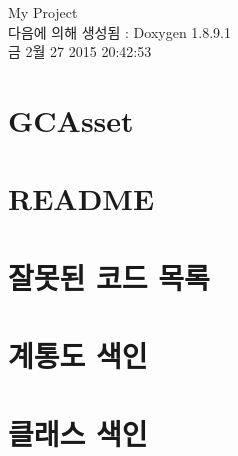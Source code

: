 \documentclass[twoside]{book}
\newcommand{\+}{\discretionary{\mbox{\scriptsize$\hookleftarrow$}}{}{}}
\newcommand{\clearemptydoublepage}{%
  \newpage{\pagestyle{empty}\cleardoublepage}%
}
\begin{document}
\hypersetup{pageanchor=false,
             bookmarks=true,
             bookmarksnumbered=true,
             pdfencoding=unicode
            }
\begin{titlepage}
\vspace*{7cm}
\begin{center}%
{\Large My Project }\\
\vspace*{1cm}
{\large 다음에 의해 생성됨 \+:  Doxygen 1.8.9.1}\\
\vspace*{0.5cm}
{\small 금 2월 27 2015 20:42:53}\\
\end{center}
\end{titlepage}
\clearemptydoublepage
\tableofcontents
\clearemptydoublepage
{}
\hypersetup{pageanchor=true}

\chapter{G\+C\+Asset}
\label{index}\hypertarget{index}{}
\chapter{R\+E\+A\+D\+M\+E}
\label{md__c_1_devtools_workspace__g_c_asset__g_c_asset__assets__g_c_server__r_e_a_d_m_e}
\hypertarget{md__c_1_devtools_workspace__g_c_asset__g_c_asset__assets__g_c_server__r_e_a_d_m_e}{}

\chapter{잘못된 코드 목록}
\label{deprecated}
\hypertarget{deprecated}{}

\chapter{계통도 색인}

\chapter{클래스 색인}

\end{document}
